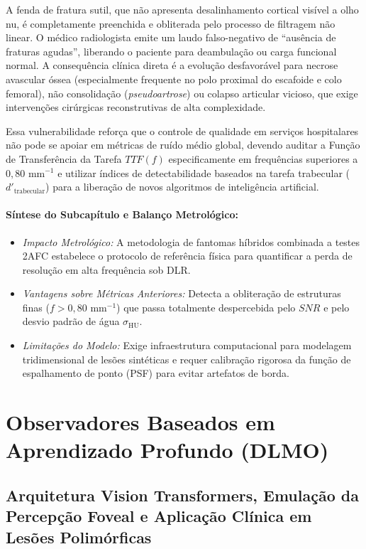 \documentclass[
  12pt,
  a4paper,
  oneside
]{report}
\begin{document}
A fenda de fratura sutil, que não apresenta desalinhamento cortical visível a olho nu, é completamente preenchida e obliterada pelo processo de filtragem não linear. O médico radiologista emite um laudo falso-negativo de ``ausência de fraturas agudas'', liberando o paciente para deambulação ou carga funcional normal. A consequência clínica direta é a evolução desfavorável para necrose avascular óssea (especialmente frequente no polo proximal do escafoide e colo femoral), não consolidação (\emph{pseudoartrose}) ou colapso articular vicioso, que exige intervenções cirúrgicas reconstrutivas de alta complexidade.

Essa vulnerabilidade reforça que o controle de qualidade em serviços hospitalares não pode se apoiar em métricas de ruído médio global, devendo auditar a Função de Transferência da Tarefa $TTF(f)$ especificamente em frequências superiores a $0{,}80\text{ mm}^{-1}$ e utilizar índices de detectabilidade baseados na tarefa trabecular ($d'_{\text{trabecular}}$) para a liberação de novos algoritmos de inteligência artificial.

\paragraph{Síntese do Subcapítulo e Balanço Metrológico:}
\begin{itemize}
  \item \emph{Impacto Metrológico:} A metodologia de fantomas híbridos combinada a testes 2AFC estabelece o protocolo de referência física para quantificar a perda de resolução em alta frequência sob DLR.
  \item \emph{Vantagens sobre Métricas Anteriores:} Detecta a obliteração de estruturas finas ($f > 0{,}80\text{ mm}^{-1}$) que passa totalmente despercebida pelo $SNR$ e pelo desvio padrão de água $\sigma_{\text{HU}}$.
  \item \emph{Limitações do Modelo:} Exige infraestrutura computacional para modelagem tridimensional de lesões sintéticas e requer calibração rigorosa da função de espalhamento de ponto (PSF) para evitar artefatos de borda.
\end{itemize}

\section{Observadores Baseados em Aprendizado Profundo (DLMO)}
\label{sec:dlmo_transformers_completo}

\subsection{Arquitetura Vision Transformers, Emulação da Percepção Foveal e Aplicação Clínica em Lesões Polimórficas}
\label{subsec:dlmo_vit_foveal_oncologia}
\end{document}
